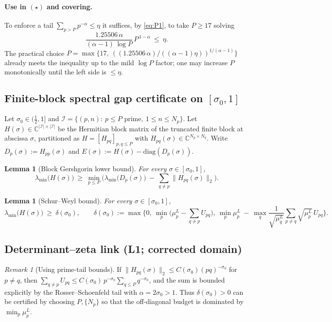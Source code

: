 \documentclass[11pt]{article}
\newtheorem{lemma}[theorem]{Lemma}
\theoremstyle{definition}
\theoremstyle{remark}
\newtheorem{remark}[theorem]{Remark}
\newcommand{\C}{\mathbb{C}}
\begin{document}
\paragraph{Use in $(\star)$ and covering.}
To enforce a tail $\sum_{p>P}p^{-\alpha}\le \eta$ it suffices, by \eqref{eq:P1}, to take $P\ge17$ solving
\[
 \frac{1.25506\,\alpha}{(\alpha-1)\,\log P}\,P^{\,1-\alpha}\ \le\ \eta.
\]
The practical choice $P=\max\{17,\ ((1.25506\,\alpha)/((\alpha-1)\eta))^{1/(\alpha-1)}\}$ already meets the inequality up to the mild $\log P$ factor; one may increase $P$ monotonically until the left side is $\le\eta$.
\subsection*{Finite-block spectral gap certificate on $[\sigma_0,1]$}
Let $\sigma_0\in(\tfrac12,1]$ and $\mathcal I=\{(p,n):\ p\le P\text{ prime},\ 1\le n\le N_p\}$. Let $H(\sigma)\in\C^{|\mathcal I|\times|\mathcal I|}$ be the Hermitian block matrix of the truncated finite block at abscissa $\sigma$, partitioned as $H=[H_{pq}]_{p,q\le P}$ with $H_{pq}(\sigma)\in\C^{N_p\times N_q}$. Write $D_p(\sigma):=H_{pp}(\sigma)$ and $E(\sigma):=H(\sigma)-\mathrm{diag}(D_p(\sigma))$.
\begin{lemma}[Block Gershgorin lower bound]\label{lem:block-gersh}
For every $\sigma\in[\sigma_0,1]$,
\[
  \lambda_{\min}\big(H(\sigma)\big)\ \ge\ \min_{p\le P}\Big(\lambda_{\min}\big(D_p(\sigma)\big)\ -\ \sum_{q\ne p}\|H_{pq}(\sigma)\|_2\Big).
\]
\end{lemma}
\begin{lemma}[Schur--Weyl bound]\label{lem:schur-weyl-gap}
For every $\sigma\in[\sigma_0,1]$,
\[
  \lambda_{\min}\big(H(\sigma)\big)\ \ge\ \delta(\sigma_0),\qquad \delta(\sigma_0):=\max\Big\{0,\ \min_p\Big(\mu_p^L-\sum_{q\ne p}U_{pq}\Big),\ \min_p \mu_p^L\ -\ \max_q\frac{1}{\sqrt{\mu_q^L}}\sum_{p\ne q}\sqrt{\mu_p^L}\,U_{pq}\Big\}.\]
\end{lemma}
\subsection*{Determinant--zeta link (L1; corrected domain)}

\begin{remark}[Using prime-tail bounds]
If $\|H_{pq}(\sigma)\|_2\le C(\sigma_0)(pq)^{-\sigma_0}$ for $p\ne q$, then $\sum_{q\ne p}U_{pq}\le C(\sigma_0)\,p^{-\sigma_0}\sum_{q\le P} q^{-\sigma_0}$, and the sum is bounded explicitly by the Rosser--Schoenfeld tail with $\alpha=2\sigma_0>1$. Thus $\delta(\sigma_0)>0$ can be certified by choosing $P,\{N_p\}$ so that the off-diagonal budget is dominated by $\min_p\mu_p^L$.
\end{remark}
\end{document}
